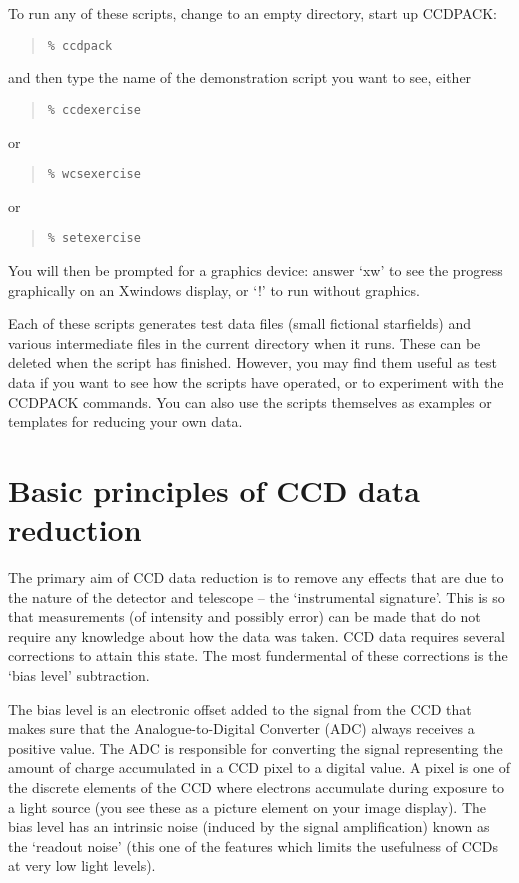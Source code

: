 \documentclass[twoside,11pt]{article}
\newcommand{\xlabel}[1]{}
\renewcommand{\_}{\texttt{\symbol{95}}}
\newenvironment{myquote}{\begin{quote}\begin{small}}{\end{small}\end{quote}}
\begin{document}
To run any of these scripts, change to an empty directory,
start up CCDPACK:
\begin{myquote}
\begin{verbatim}
% ccdpack
\end{verbatim}
\end{myquote}
and then type the name of the demonstration script you want to see, 
either
\begin{myquote}
\begin{verbatim}
% ccdexercise
\end{verbatim}
\end{myquote}
or
\begin{myquote}
\begin{verbatim}
% wcsexercise
\end{verbatim}
\end{myquote}
or
\begin{myquote}
\begin{verbatim}
% setexercise
\end{verbatim}
\end{myquote}
You will then be prompted for a graphics device: 
answer `xw' to see the progress graphically on an Xwindows display,
or `!' to run without graphics.

Each of these scripts generates test data files (small fictional
starfields) and various intermediate files in the current directory
when it runs.  These can be deleted when the script has finished.
However, you may find them useful as test data if you want to 
see how the scripts have operated, or to experiment with the CCDPACK
commands.  You can also use the scripts themselves as examples or
templates for reducing your own data.


\section{Basic principles of CCD data reduction\xlabel{CCDprinciples}}

The primary aim of CCD data reduction is to remove any effects that are
due to the nature of the detector and telescope -- the `instrumental
signature'.
This is so that measurements (of intensity and possibly error) can be
made that do not require any knowledge about how the data was taken.
CCD data requires several corrections to attain this state.
The most fundermental of these corrections is the `bias level' subtraction.

The bias level is an electronic offset added to the signal from the
CCD that makes sure that the Analogue-to-Digital Converter (ADC)
always receives a positive value.
The ADC is responsible for converting the signal representing
the amount of charge accumulated in a CCD pixel to a digital value.
A pixel is one of the discrete elements of the CCD where electrons
accumulate during exposure to a light source (you see these as a
picture element on your image display).
The bias level has an intrinsic noise (induced by the signal
amplification) known as the `readout noise' (this one of the features
which limits the usefulness of CCDs at very low light levels).
\end{document}
